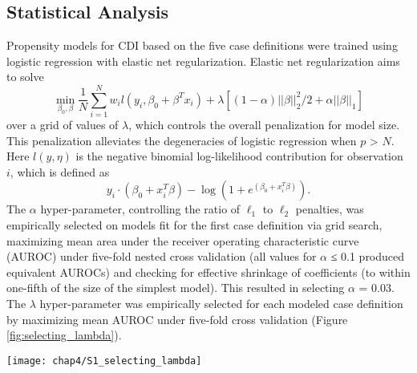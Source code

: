 \subsection{Statistical Analysis}

Propensity models for CDI based on the five case definitions were trained using logistic regression with elastic net regularization. Elastic net regularization aims to solve $$\min_{\beta_0,\beta} \frac{1}{N} \sum_{i=1}^{N} w_i l(y_i,\beta_0+\beta^T x_i) + \lambda\left[(1-\alpha)||\beta||_2^2/2 + \alpha ||\beta||_1\right]$$ over a grid of values of $\lambda$, which controls the overall penalization for model size. This penalization alleviates the degeneracies of logistic regression when $p$ > $N$. Here $l(y,\eta)$ is the negative binomial log-likelihood contribution for observation $i$, which is defined as $$y_i \cdot (\beta_0 + x_i^T \beta) - \log (1+e^{(\beta_0+x_i^T \beta)}).$$ The $\alpha$ hyper-parameter, controlling the ratio of $\ell_1$ to $\ell_2$ penalties, was empirically selected on models fit for the first case definition via grid search, maximizing mean area under the receiver operating characteristic curve (AUROC) under five-fold nested cross validation (all values for $\alpha$ ≤ 0.1 produced equivalent AUROCs) and checking for effective shrinkage of coefficients (to within one-fifth of the size of the simplest model). This resulted in selecting $\alpha$ = 0.03. The $\lambda$ hyper-parameter was empirically selected for each modeled case definition by maximizing mean AUROC under five-fold cross validation (Figure \ref{fig:selecting_lambda}).
\begin{figure*}[tbp]
  \texttt{[image: chap4/S1\_selecting\_lambda]}
\end{figure*}
